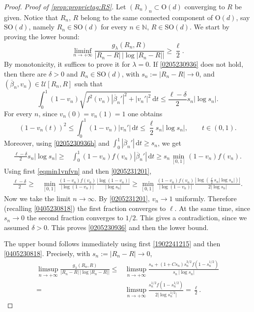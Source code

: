 \documentclass[a4paper,reqno]{amsart}
\newcommand\N{\mathbb{N}}
\newcommand\calU{\mathcal{U}}
\newcommand\dt{{\,\mathrm{d}t}}
\theoremstyle{remark}
\newcommand{\ol}{\overline}
\newcommand{\SOn}{\mathrm{SO}(d)}
\newcommand{\On}{\mathrm{O}(d)}
\numberwithin{equation}{section}
\begin{document}
\begin{proof}
\noindent \textit{Proof of \ref{prop:proprietag:RS}.} Let $(R_n)_n\subset \On$ converging to $R$ be given. Notice that $R_n$, $R$ belong to the same connected component of $\On$, say $\SOn$, namely $R_n \in \SOn$ for every $n\in\N$, $R\in \SOn$.   We start by proving the lower bound:
\begin{equation}\label{0205230936}
	\liminf_{n\to +\infty}\frac{g_\lambda(R_n, R)}{|R_n-R| \,\big|\log |R_n-R|\big|}\geq \frac{\ell}{2}.
\end{equation}
By monotonicity, it suffices to prove it for $\lambda=0$.
If \eqref{0205230936} does not hold, then there are $\delta>0$ and 
$R_n\in \SOn$, with $s_n:=|R_n-R|\to0$,
and
$(\ol\beta_n,v_n)\in\calU[R_n,R]$ such that
\begin{equation}\label{0205230936b}
\int_0^1 (1-v_n) \sqrt{f^2(v_n) |\ol\beta_n'|^2+|v_n'|^2} \dt \le
 \frac{\ell-\delta}{2} s_n |\log s_n|.
\end{equation}
For every $n$, since
$v_n(0)=v_n(1)=1$ one obtains
\begin{equation}\label{0205231201}
{(1-v_{n}(t))^2} \le
\int_0^1  (1-v_n)|v_n'|\dt \le
 \frac{\ell}{2} s_n |\log s_n|, \qquad t\in (0,1).
\end{equation}
Moreover, using \eqref{0205230936b} and
$\int_0^1  |\ol\beta_n'| \dt \geq s_n$, we get
\begin{equation}\label{eqmin1vnfvn}
 \begin{split}
 \frac{\ell-\delta}{2} s_n |\log s_n|\ge&
\int_0^1 (1-v_n) f(v_n) |\ol\beta_n'|\dt
\ge s_n \min_{[0,1]} (1-v_n) f(v_n).
\end{split}
\end{equation}
Using first \eqref{eqmin1vnfvn} and then
\eqref{0205231201},
\begin{equation}
\begin{split}
 \frac{\ell-\delta}{2} \ge&
 \min_{[0,1]}
\frac{(1-v_n) f(v_n)}{|\log(1-v_n)|}
\frac{|\log(1-v_n)|} {|\log s_n|}
\ge\min_{[0,1]}
\frac{(1-v_n) f(v_n)}
{|\log(1-v_n)|}
\frac{{|\log (\frac\ell2 s_n |\log s_n|)|}}{ 2|\log s_n|}.
\end{split}\end{equation}
Now we take the limit $n\to\infty$.
By \eqref{0205231201},
$v_n\to1$ uniformly. Therefore
(recalling \eqref{0405230818})
the first fraction converges to $\ell$.
At the same time, since $s_n\to0$ the second fraction converges to $1/2$.
This gives a contradiction, since we assumed $\delta>0$.
This proves
\eqref{0205230936} and then the lower bound.


The upper bound follows immediately using first \eqref{1902241215} and then
\eqref{0405230818}. Precisely, with $s_n:=|R_n-R|\to0$,
\[
\begin{split}
	\limsup_{n\to +\infty}  \frac{g_\lambda( R_n, R)}{|R_n-R| \,\big|\log |R_n-R|\big|}
	\leq&
	\limsup_{n\to +\infty}\frac{s_n +
	(1+Cs_n)
	s_n^{3/2} f(1-s_n^{1/2 })}
	{s_n \,\big|\log s_n\big|}
	\\  =&
	\limsup_{n\to +\infty}\frac{s_n^{1/2}
	f(1-s_n^{1/2})}
	{2\big|\log s_n^{1/2}\big|} =
	\frac{\ell}{2}.
\end{split}
\]


\end{proof}
\end{document}
